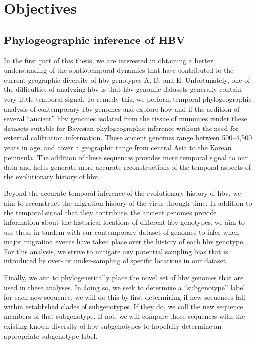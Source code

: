 \chapter{Objectives}
\label{ch:objectives}

\section{Phylogeographic inference of HBV}

In the first part of this thesis, we are interested in obtaining a better understanding of the spatiotemporal dynamics that have contributed to the current geographic diversity of \gls{hbv} genotypes A, D, and E.
Unfortunately, one of the difficulties of analyzing \gls{hbv} is that \gls{hbv} genomic datasets generally contain very little temporal signal.
To remedy this, we perform temporal phylogeographic analysis of contemporary \gls{hbv} genomes and explore how and if the addition of several ``ancient'' \gls{hbv} genomes isolated from the tissue of mummies \cite{muhlemann2018ancient, ross2018paradox} render these datasets suitable for Bayesian phylogeographic inference without the need for external calibration information.
These ancient genomes range between 500--4,500 years in age, and cover a geographic range from central Asia to the Korean peninsula.
The addition of these sequences provides more temporal signal to our data and helps generate more accurate reconstructions of the temporal aspects of the evolutionary history of \gls{hbv}.

Beyond the accurate temporal inference of the evolutionary history of \gls{hbv}, we aim to reconstruct the migration history of the virus through time.
In addition to the temporal signal that they contribute, the ancient genomes provide information about the historical locations of different \gls{hbv} genotypes.
we aim to use these in tandem with our contemporary dataset of genomes to infer when major migration events have taken place over the history of each \gls{hbv} genotype.
For this analysis, we strive to mitigate any potential sampling bias that is introduced by over- or under-sampling of specific locations in our dataset.

Finally, we aim to phylogenetically place the novel set of \gls{hbv} genomes that are used in these analyses.
In doing so, we seek to determine a ``subgenotype'' label for each new sequence.
we will do this by first determining if new sequences fall within established clades of subgenotypes.
If they do, we call the new sequence  members of that subgenotype.
If not, we will compare those sequences with the existing known diversity of \gls{hbv} subgenotypes to hopefully determine an appropriate subgenotype label.%


